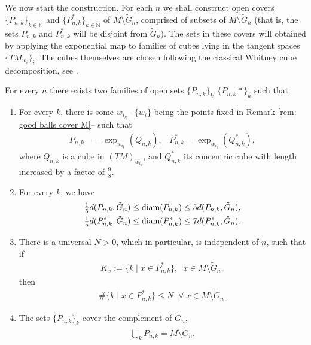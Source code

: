 \documentclass[11pt,reqno]{amsart}
\numberwithin{equation}{section}
\theoremstyle{plain}
\begin{document}
  We now start the construction.  For each $n$ we shall construct open covers $\{P_{n,k}\}_{k\in\mathbb{N}}$ and $\{P_{n,k}^*\}_{k\in\mathbb{N}}$ of  $M\setminus \tilde G_n$, comprised of subsets of $M \setminus \tilde G_n$ (that is, the sets $P_{n,k}$ and $P_{n,k}^*$ will be disjoint from $\tilde G_n$). The sets in these covers will obtained by applying the exponential map to families of cubes lying in the tangent spaces $\{TM_{w_i}\}_i$. The cubes themselves are chosen following the classical Whitney cube decomposition, see \cite[Chp 6, Thm 1]{Stei-71}.
  
  \begin{lem}\label{lem:CubesOnM}
    For every $n$ there exists two families of open sets $\{P_{n,k}\}_k,\{P_{n,k}*\}_k$ such that
    \begin{enumerate}
      \item For every $k$, there is some $w_{i_k}$ --$\{w_i\}$ being the points fixed in Remark \ref{rem: good balls cover M}-- such that
        \begin{align*}	  
          P_{n,k} & = \exp_{w_{i_k}}( Q_{n,k}),\;\;\;P_{n,k}^*= \exp_{w_{i_k}}( Q_{n,k}^*),			  
        \end{align*}  
      where $Q_{n,k}$ is a cube in $(TM)_{w_{i_k}}$, and $Q_{n,k}^*$ its concentric cube with length increased by a factor of $\tfrac{9}{8}$.
      \item For every $k$, we have 	  	  
        \begin{align*}
          \tfrac{1}{5}d(P_{n,k},\tilde G_n)\leq \textnormal{diam}(P_{n,k}) \leq 5d(P_{n,k},\tilde G_n),\\
          \tfrac{1}{5}d(P_{n,k}^*,\tilde G_n)\leq \textnormal{diam}(P_{n,k}^*) \leq 7d(P_{n,k}^*,\tilde G_n).		  
        \end{align*}
      \item There is a universal $N>0$, which in particular, is independent of $n$, such that if
	  \begin{align}
            K_x:= \{k \mid x\in P_{n,k}^*\},\;\;x\in M\setminus \tilde G_n,\label{eqFinDim:Set Of Covering Cubes}
	  \end{align}
	then
        \begin{align}
          \# \{ k \mid x\in P_{n,k}^*\} \leq N \;\;\forall\;x\in M\setminus \tilde G_n. \label{eqFinDim:Size Set Of Covering Cubes}
        \end{align}
      \item The sets $\{P_{n,k}\}_k$ cover the complement of $\tilde G_n$,
        \begin{align*}
          \bigcup \limits_{k} P_{n,k} = M \setminus \tilde G_n.
        \end{align*}
    \end{enumerate}	
  \end{lem}
  
\end{document}
